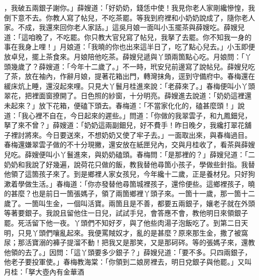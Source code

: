 ，我破五兩銀子謝你。」薛嫂道：「好奶奶，錢恁中使！我見你老人家剛纔慘惶，我倒下意不去。你教人寫了帖兒，不吃茶罷。等我到府裡和小奶奶說成了，隨你老人家。不成，我還來回你老人家話。」這吳月娘一面叫小玉擺茶與薛嫂吃。薛嫂兒道：「這咱晚了，不吃罷。你只教大官兒寫了帖兒，我拏了去罷。你不知我一身的事在我身上哩！」月娘道：「我曉的你也出來這半日了，吃了點心兒去。」小玉即便放卓兒，擺上茶食來。月娘陪他吃茶。薛嫂兒遞與丫頭兩箇點心吃。月娘問：「丫頭幾歲了？薛嫂道：「今年十二歲了。」不一時，玳安兒前邊寫了說帖兒。薛嫂兒吃了茶，放在袖內，作辭月娘，提著花箱出門，轉灣抹角，逕到守備府中。春梅還在緩床炕上睡，還沒起來哩。只見大丫鬟月桂進來說：「老薛來了。」春梅便叫小丫頭翠花，把裡面窗撩開了。日色照的紗窗，十分明亮。薛嫂進去說道：「奶奶這裡還未起來？」放下花箱，便磕下頭去。春梅道：「不當家化化的，磕甚麼頭！」說道：「我心裡不自在，今日起來的遲些。」問道：「你做的我翠雲子，和九鳳鈿兒，拏了來不曾？」薛嫂道：「奶奶這兩副鈿兒，好不費手！昨日晚夕，我纔打翠花舖子裡討將來。今日要送來，不想奶奶又使了牢子去。」一面取出來，與春梅過目。春梅還嫌翠雲子做的不十分現撇，還安放在紙匣兒內，交與月桂收了，看茶與薛嫂兒吃。薛嫂便叫小丫鬟進來，與奶奶磕頭。春梅問：「是那裡的？」薛嫂兒道：「二奶奶和我說了好幾遍，說荷花只做的飯，教我替他尋箇小孩子，學做些針指。我替他領了這箇孩子來了。到是鄉裡人家女孩兒，今年纔十二歲，正是養材兒。只好狗漱着學做生活。」春梅道：「你亦發替他尋箇城裡孩子，還伶便些。這鄉裡孩子，曉的甚麼？也是前日一箇張媽子，領了兩箇鄉裡丫頭子來。一箇十一歲，那一箇十二歲了。一箇叫生金，一個叫活寶。兩箇且是不善，都要五兩銀子，孃老子就在外頭等著要銀子。我說且留他住一日兒，試試手兒，會答應不會，教他明日來領銀子罷。死活留下他一夜。丫頭們不知好歹，與了他些肉湯子泡飯吃了。到第二日天明，只見丫頭們嚷亂起來。我便罵賊奴才，亂的是甚麼？原來那生金，撒了被窩尿；那活寶溺的褲子提溜不動！把我又是那笑，又是那砢硶。等的張媽子來，還教他領的去了。」因問：「這丫頭要多少銀子？」薛嫂兒道：「要不多。只四兩銀子，他老子要投軍使。」春梅教海棠：「你領到二娘房裡去，明日兌銀子與他罷。」又叫月桂：「拏大壺內有金華酒 